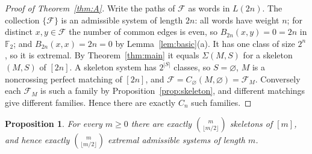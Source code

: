\documentclass[11pt]{amsart}
\newtheorem{proposition}[theorem]{Proposition}
\theoremstyle{definition}
\theoremstyle{remark}
\numberwithin{equation}{section}
\newcommand{\F}{\mathbb{F}}
\newcommand{\cF}{\mathcal{F}}
\begin{document}
\begin{proof}[Proof of Theorem~\ref{thm:A}]
Write the paths of $\cF$ as words in $L(2n)$. The collection $\{\cF\}$ is an admissible system of length $2n$: all words have weight $n$; for distinct $x,y\in\cF$ the number of common edges is even, so $B_{2n}(x,y)=0=2n$ in $\F_2$; and $B_{2n}(x,x)=2n=0$ by Lemma~\ref{lem:basic}(a). It has one class of size $2^n$, so it is extremal. By Theorem~\ref{thm:main} it equals $\Sigma(M,S)$ for a skeleton $(M,S)$ of $[2n]$. A skeleton system has $2^{|S|}$ classes, so $S=\varnothing$, $M$ is a noncrossing perfect matching of $[2n]$, and $\cF=C_\varnothing(M,\varnothing)=\cF_M$. Conversely each $\cF_M$ is such a family by Proposition~\ref{prop:skeleton}, and different matchings give different families. Hence there are exactly $C_n$ such families.
\end{proof}

\begin{proposition}\label{prop:count}
For every $m\ge0$ there are exactly $\binom{m}{\lfloor m/2\rfloor}$ skeletons of $[m]$, and hence exactly $\binom{m}{\lfloor m/2\rfloor}$ extremal admissible systems of length $m$.
\end{proposition}
\end{document}
